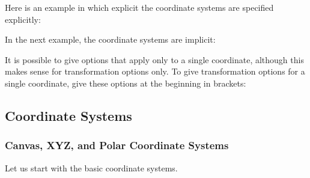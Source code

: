 Here is an example in which explicit the coordinate systems are specified
explicitly:
%
\begin{codeexample}[]
\end{codeexample}
%
In the next example, the coordinate systems are implicit:
%
\begin{codeexample}[]
\end{codeexample}

It is possible to give options that apply only to a single coordinate, although
this makes sense for transformation options only. To give transformation
options for a single coordinate, give these options at the beginning in
brackets:
%
\begin{codeexample}[]
\end{codeexample}


\subsection{Coordinate Systems}

\subsubsection{Canvas, XYZ, and Polar Coordinate Systems}

Let us start with the basic coordinate systems.

